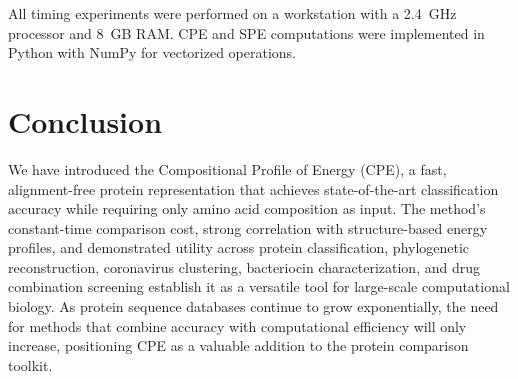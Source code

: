 \documentclass[11pt]{article}
\begin{document}
All timing experiments were performed on a workstation with a 2.4~GHz processor and 8~GB RAM. CPE and SPE computations were implemented in Python with NumPy for vectorized operations.

\section{Conclusion}

We have introduced the Compositional Profile of Energy (CPE), a fast, alignment-free protein representation that achieves state-of-the-art classification accuracy while requiring only amino acid composition as input. The method's constant-time comparison cost, strong correlation with structure-based energy profiles, and demonstrated utility across protein classification, phylogenetic reconstruction, coronavirus clustering, bacteriocin characterization, and drug combination screening establish it as a versatile tool for large-scale computational biology. As protein sequence databases continue to grow exponentially, the need for methods that combine accuracy with computational efficiency will only increase, positioning CPE as a valuable addition to the protein comparison toolkit.



\end{document}
